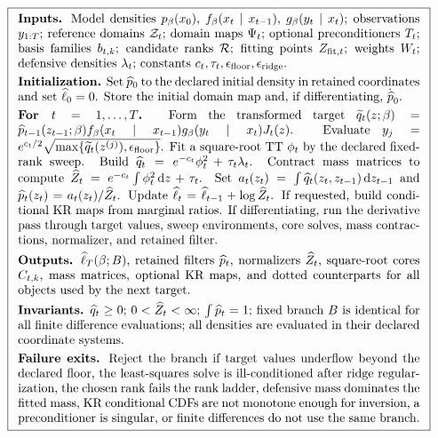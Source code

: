 \documentclass[11pt]{article}
\numberwithin{equation}{section}
\newcommand{\dd}{\,\mathrm d}
\begin{document}
\begin{equation}
\boxed{
\begin{array}{p{0.94\linewidth}}
\textbf{Inputs.}
Model densities \(p_\beta(x_0)\), \(f_\beta(x_t\mid x_{t-1})\),
\(g_\beta(y_t\mid x_t)\); observations \(y_{1:T}\); reference domains
\(\mathcal Z_t\); domain maps \(\Psi_t\); optional preconditioners \(T_t\);
basis families \(b_{t,k}\); candidate ranks \(\mathcal R\); fitting points
\(Z_{{\rm fit},t}\); weights \(W_t\); defensive densities \(\lambda_t\);
constants \(c_t,\tau_t,\epsilon_{\rm floor},\epsilon_{\rm ridge}\).
\\[1mm]
\textbf{Initialization.}
Set \(\widehat p_0\) to the declared initial density in retained coordinates
and set \(\widehat\ell_0=0\).  Store the initial domain map and, if
differentiating, \(\dot{\widehat p}_0\).
\\[1mm]
\textbf{For \(t=1,\ldots,T\).}
Form the transformed target
\(\widetilde q_t(z;\beta)=\widehat p_{t-1}(z_{t-1};\beta)
f_\beta(x_t\mid x_{t-1})g_\beta(y_t\mid x_t)J_t(z)\).
Evaluate \(y_j=e^{c_t/2}\sqrt{\max\{\widetilde q_t(z^{(j)}),\epsilon_{\rm floor}\}}\).
Fit a square-root TT \(\phi_t\) by the declared fixed-rank sweep.
Build
\(\widehat q_t=e^{-c_t}\phi_t^2+\tau_t\lambda_t\).
Contract mass matrices to compute
\(\widehat Z_t=e^{-c_t}\int\phi_t^2\dd z+\tau_t\).
Set
\(a_t(z_t)=\int \widehat q_t(z_t,z_{t-1})\dd z_{t-1}\) and
\(\widehat p_t(z_t)=a_t(z_t)/\widehat Z_t\).
Update \(\widehat\ell_t=\widehat\ell_{t-1}+\log\widehat Z_t\).
If requested, build conditional KR maps from marginal ratios.
If differentiating, run the derivative pass through target values, sweep
environments, core solves, mass contractions, normalizer, and retained filter.
\\[1mm]
\textbf{Outputs.}
\(\widehat\ell_T(\beta;B)\), retained filters
\(\widehat p_t\), normalizers \(\widehat Z_t\), square-root cores \(C_{t,k}\),
mass matrices, optional KR maps, and dotted counterparts for all objects used
by the next target.
\\[1mm]
\textbf{Invariants.}
\(\widehat q_t\ge0\); \(0<\widehat Z_t<\infty\);
\(\int \widehat p_t=1\); fixed branch \(B\) is identical for all finite
difference evaluations; all densities are evaluated in their declared
coordinate systems.
\\[1mm]
\textbf{Failure exits.}
Reject the branch if target values underflow beyond the declared floor,
the least-squares solve is ill-conditioned after ridge regularization, the
chosen rank fails the rank ladder, defensive mass dominates the fitted mass,
KR conditional CDFs are not monotone enough for inversion, a preconditioner is
singular, or finite differences do not use the same branch.
\end{array}}
\label{eq:p24-boxed-filter}
\end{equation}
\end{document}
